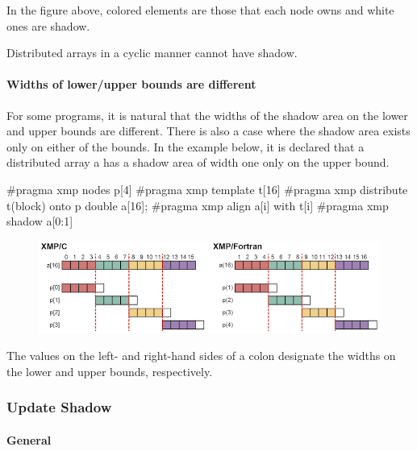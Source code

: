 In the figure above, colored elements are those that each node owns and white ones are shadow.

\begin{mynote}
Distributed arrays in a cyclic manner cannot have shadow.  
\end{mynote}

\paragraph{Widths of lower/upper bounds are different}

For some programs, it is natural that the widths of the shadow area on
the lower and upper bounds are different. There is also a case where the
shadow area exists only on either of the bounds. In the example below,
it is declared that a distributed array a has a shadow area of width one
only on the upper bound.

\begin{XCexample}
#pragma xmp nodes p[4]
#pragma xmp template t[16]
#pragma xmp distribute t(block) onto p
double a[16];
#pragma xmp align a[i] with t[i]
#pragma xmp shadow a[0:1]
\end{XCexample}


\begin{figure}
  \centering
  \includegraphics{figs/shadow_uneven.png}
\end{figure}

The values on the left- and right-hand sides of a colon designate the
widths on the lower and upper bounds, respectively.

\subsubsection{Update Shadow}

\paragraph{General}

